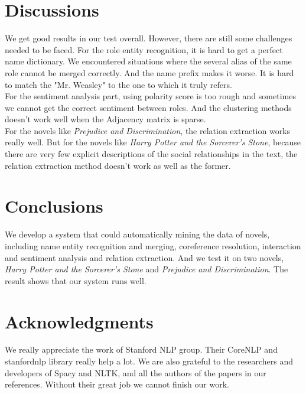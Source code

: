 \documentclass[11pt]{article}
\begin{document}
\section{Discussions} %
We get good results in our test overall. However, there are still some challenges needed to be faced. For the role entity recognition, it is hard to get a perfect name dictionary. We encountered situations where the several alias of the same role cannot be merged correctly. And the name prefix makes it worse. It is hard to match the "Mr. Weasley" to the one to which it truly refers. \\
For the sentiment analysis part, using polarity score is too rough and sometimes we cannot get the correct sentiment between roles. And the clustering methods doesn't work well when the Adjacency matrix is sparse. \\
For the novels like \textit{Prejudice and Discrimination}, the relation extraction works really well. But for the novels like \textit{Harry Potter and the Sorcerer's Stone}, because there are very few explicit descriptions of the social relationships in the text, the relation extraction method doesn't work as well as the former.

\section{Conclusions} %
\label{sec:length}
We develop a system that could automatically mining the data of novels, including name entity recognition and merging, coreference resolution, interaction and sentiment analysis and relation extraction. And we test it on two novels, \textit{Harry Potter and the Sorcerer's Stone} and \textit{Prejudice and Discrimination}. The result shows that our system runs well.

\section*{Acknowledgments} %

We really appreciate the work of Stanford NLP group. Their CoreNLP and stanfordnlp library really help a lot. We are also grateful to the researchers and developers of Spacy and NLTK, and all the authors of the papers in our references. Without their great job we cannot finish our work.



\end{document}
